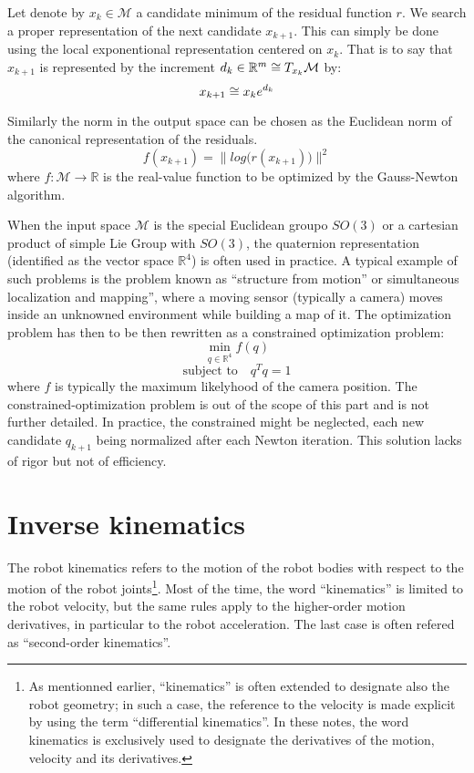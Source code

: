 \documentclass{book}
\begin{document}
Let denote by $x_k \in \mathcal{M}$ a candidate minimum of the residual function $r$. We search a proper representation of the next candidate $x_{k+1}$. This can simply be done using the local exponentional representation centered on $x_k$. That is to say that $x_{k+1}$ is represented by the increment $d_k \in \mathbb{R}^m \cong T_{x_k} \mathcal{M}$  by:
$$ x_{k+1} \cong x_k e^{d_k} $$

Similarly the norm in the output space can be chosen as the Euclidean norm of the canonical representation of the residuals. 
$$ f(x_{k+1}) = \Big\| log \big( r(x_{k+1}) \big) \Big\|^2 $$
where $f: \mathcal{M} \rightarrow \mathbb{R}$ is the real-value function to be optimized by the Gauss-Newton algorithm.


When the input space $\mathcal{M}$ is the special Euclidean groupo $SO(3)$ or a cartesian product of simple Lie Group with $SO(3)$, the quaternion representation (identified as the vector space $\mathbb{R}^4$) is often used in practice. A typical example of such problems is the problem known as ``structure from motion'' or simultaneous localization and mapping'', where a moving sensor (typically a camera) moves inside an unknowned environment while building a map of it. The optimization problem has then to be then rewritten as a constrained optimization problem:
$$ \min_{q \in \mathbb{R}^4} f(q) $$
$$ \textrm{subject to} \quad  q^T q = 1 $$
where $f$ is typically the maximum likelyhood of the camera position.
The constrained-optimization problem is out of the scope of this part and is not further detailed. In practice, the constrained might be neglected, each new candidate $q_{k+1}$ being normalized after each Newton iteration. This solution lacks of rigor but not of efficiency. 


\part{Inverse kinematics}

The robot kinematics refers to the motion of the robot bodies with respect to the motion of the robot joints\footnote{As mentionned earlier, ``kinematics'' is often extended to designate also the robot geometry; in such a case, the reference to the velocity is made explicit by using the term ``differential kinematics''. In these notes, the word kinematics is exclusively used to designate the derivatives of the motion, \mie velocity and its derivatives.}. Most of the time, the word ``kinematics'' is limited to the robot velocity, but the same rules apply to the higher-order motion derivatives, in particular to the robot acceleration. The last case is often refered as ``second-order kinematics''. 
\end{document}
